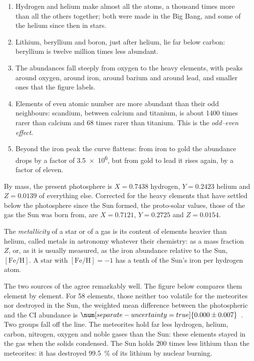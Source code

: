 \begin{enumerate}
\item Hydrogen and helium make almost all the atoms, a thousand times
  more than all the others together; both were made in the Big Bang, and
  some of the helium since then in stars.
\item Lithium, beryllium and boron, just after helium, lie far below
  carbon: beryllium is twelve million times less abundant.
\item The abundances fall steeply from oxygen to the heavy elements, with
  peaks around oxygen, around iron, around barium and around lead, and
  smaller ones that the figure labels.
\item Elements of even atomic number are more abundant than their odd
  neighbours: scandium, between calcium and titanium, is about \num{1400}
  times rarer than calcium and \num{68} times rarer than titanium. This
  is the \emph{odd--even effect}.
\item Beyond the iron peak the curve flattens: from iron to gold the
  abundance drops by a factor of \num{3.5e6}, but from gold to lead it
  rises again, by a factor of eleven.
\end{enumerate}

By mass, the present photosphere is $X = 0.7438$ hydrogen,
$Y = 0.2423$ helium and $Z = 0.0139$ of everything else. Corrected for
the heavy elements that have settled below the photosphere since the Sun
formed, the proto-solar values, those of the gas the Sun was born from,
are $X = 0.7121$, $Y = 0.2725$ and $Z = 0.0154$.

\begin{definition}[Metallicity]\label{def:b3:origin-of-elements:metallicity}
The \emph{metallicity} of a star or of a gas is its
content of elements heavier than helium, called metals in astronomy
whatever their chemistry: as a mass fraction $Z$, or, as it is usually
measured, as the iron abundance relative to the Sun, $[\mathrm{Fe/H}]$.
A star with $[\mathrm{Fe/H}] = -1$ has a tenth of the Sun's iron per
hydrogen atom.
\end{definition}

The two sources of the  agree remarkably well. The
figure below compares them element by element. For 58 elements, those
neither too volatile for the meteorites nor destroyed in the Sun, the
weighted mean difference between the photospheric and the CI abundance
is $\num[separate-uncertainty=true]{0.000 \pm 0.007}$~. Two groups
fall off the line. The meteorites hold far less hydrogen, helium,
carbon, nitrogen, oxygen and noble gases than the Sun: these elements
stayed in the gas when the solids condensed. The Sun holds
\num{200} times less lithium than the meteorites: it has destroyed
\qty{99.5}{\percent} of its lithium by nuclear burning.


